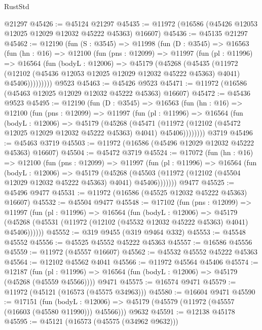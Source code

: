 \begin{lexlean}{RustStd}
\begin{coremodule}
    @21297
@45426 := @45124 @21297
@45435 := @11972 (@16586 (@45426 @12053 @12025 @12029 @12032 @45222 @45363) @16607)
@45436 := @45135 @21297
@45462 := @12190
    (fun (S : @3545) =>
    @11998
      (fun (D : @3545) =>
      @16563
        (fun (hn : @16) =>
        @12100
          (fun (pns : @12099) =>
          @11997
            (fun (pl : @11996) =>
            @16564
              (fun (bodyL : @12006) =>
              @45179
                (@45268
                  (@45435
                    (@11972
                      (@12102 (@45436 @12053 @12025 @12029 @12032 @45222 @45363) @4041)
                      @45406)))))))))
    @9523
@45463 := @45426 @9523
@45471 := @11972 (@16586 (@45463 @12025 @12029 @12032 @45222 @45363) @16607)
@45472 := @45436 @9523
@45495 := @12190
    (fun (D : @3545) =>
    @16563
      (fun (hn : @16) =>
      @12100
        (fun (pns : @12099) =>
        @11997
          (fun (pl : @11996) =>
          @16564
            (fun (bodyL : @12006) =>
            @45179
              (@45268
                (@45471
                  (@11972 (@12102 (@45472 @12025 @12029 @12032 @45222 @45363) @4041) @45406))))))))
    @3719
@45496 := @45463 @3719
@45503 := @11972 (@16586 (@45496 @12029 @12032 @45222 @45363) @16607)
@45504 := @45472 @3719
@45524 := @17072
    (fun (hn : @16) =>
    @12100
      (fun (pns : @12099) =>
      @11997
        (fun (pl : @11996) =>
        @16564
          (fun (bodyL : @12006) =>
          @45179
            (@45268
              (@45503 (@11972 (@12102 (@45504 @12029 @12032 @45222 @45363) @4041) @45406)))))))
    @9477
@45525 := @45496 @9477
@45531 := @11972 (@16586 (@45525 @12032 @45222 @45363) @16607)
@45532 := @45504 @9477
@45548 := @17102
    (fun (pns : @12099) =>
    @11997
      (fun (pl : @11996) =>
      @16564
        (fun (bodyL : @12006) =>
        @45179 (@45268 (@45531 (@11972 (@12102 (@45532 @12032 @45222 @45363) @4041) @45406))))))
@45552 := @319 @9455 (@319 @9464 @332)
@45553 := @45548 @45552
@45556 := @45525 @45552 @45222 @45363
@45557 := @16586 @45556
@45559 := @11972 (@45557 @16607)
@45562 := @45532 @45552 @45222 @45363
@45564 := @12102 @45562 @4041
@45566 := @11972 @45564 @45406
@45574 := @12187
    (fun (pl : @11996) => @16564 (fun (bodyL : @12006) => @45179 (@45268 (@45559 @45566))))
    @9471
@45575 := @16574 @9471
@45579 := @11972 (@45121 (@16573 (@45575 @34963)))
@45580 := @16604 @9471
@45590 := @17151
    (fun (bodyL : @12006) => @45179 (@45579 (@11972 (@45557 (@16603 (@45580 @11990))) @45566)))
    @9632
@45591 := @12138 @45178
@45595 := @45121 (@16573 (@45575 (@34962 @9632)))

\end{coremodule}
\end{lexlean}
